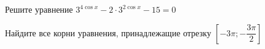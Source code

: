 \begin{ex}
	\begin{condition}
		\begin{enumcols}[label=\asbuk*)]
			\item Решите уравнение \( 3^{4\cos x } - 2\cdot3^{2\cos x} -15 = 0 \)
			\item Найдите все корни уравнения, принадлежащие отрезку \( \left[-3\pi;-\dfrac{3\pi}{2}\right] \)
		\end{enumcols}
	\end{condition}
\end{ex}